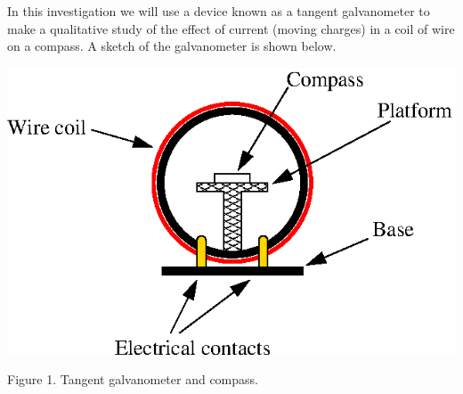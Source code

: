 In this investigation we will use a device known as a tangent galvanometer to make a qualitative study of the effect of current (moving charges) in a coil of wire on a compass. A sketch of the galvanometer is shown below.

\begin{center}
\includegraphics{magnetism_3/tangent_galvanometer.eps}
\par
Figure 1. Tangent galvanometer and compass.
\end{center}

